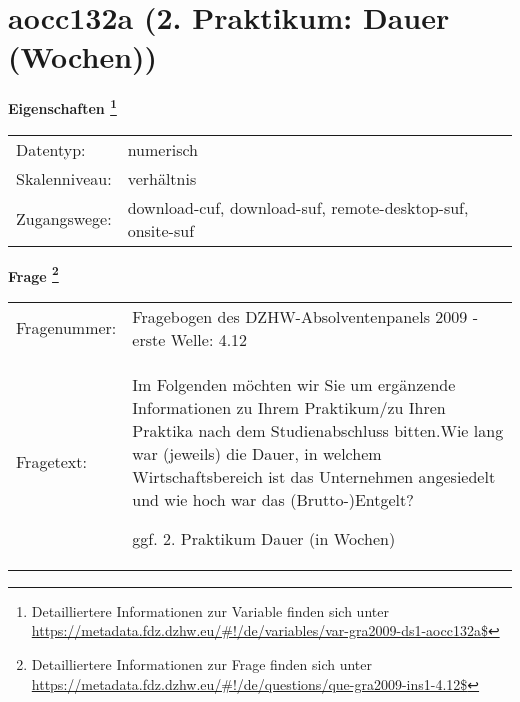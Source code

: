 
    \setcounter{footnote}{0}

    \vspace*{-1.8cm}
	\section{aocc132a (2. Praktikum: Dauer (Wochen))}
	\label{section:aocc132a}



    \vspace*{0.5cm}
    \noindent\textbf{Eigenschaften
	\footnote{Detailliertere Informationen zur Variable finden sich unter
		\url{https://metadata.fdz.dzhw.eu/\#!/de/variables/var-gra2009-ds1-aocc132a$}}}\\
	\begin{tabularx}{\hsize}{@{}lX}
	Datentyp: & numerisch \\
	Skalenniveau: & verhältnis \\
	Zugangswege: &
	  download-cuf, 
	  download-suf, 
	  remote-desktop-suf, 
	  onsite-suf
 \\
    \end{tabularx}



				\vspace*{0.5cm}
                \noindent\textbf{Frage
	                \footnote{Detailliertere Informationen zur Frage finden sich unter
		              \url{https://metadata.fdz.dzhw.eu/\#!/de/questions/que-gra2009-ins1-4.12$}}}\\
				\begin{tabularx}{\hsize}{@{}lX}
					Fragenummer: &
					  Fragebogen des DZHW-Absolventenpanels 2009 - erste Welle:
					  4.12
 \\
					Fragetext: & Im Folgenden möchten wir Sie um ergänzende Informationen zu Ihrem Praktikum/zu Ihren Praktika nach dem Studienabschluss bitten.Wie lang war (jeweils) die Dauer, in welchem Wirtschaftsbereich ist das Unternehmen angesiedelt und wie hoch war das (Brutto-)Entgelt?\par  ggf. 2. Praktikum Dauer (in Wochen) \\
				\end{tabularx}






